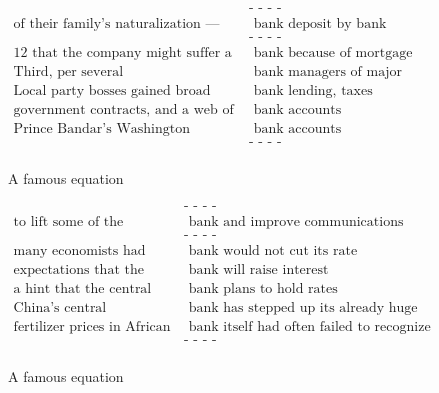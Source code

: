 \documentclass[a4paper,12pt,twoside,openright]{report}
\begin{document}
\begin{figure}[H]
\begin{align}
\text{                                                 } & \text{- - - -} \nonumber \\
\text{of their family’s naturalization —} & \text{ bank deposit by bank deposit} \nonumber \\
\text{                                                 } & \text{- - - -} \nonumber \\
\text{12 that the company might suffer a run on the} & \text{ bank because of mortgage concerns} \nonumber \\
\text{Third, per several} & \text{ bank managers of major national banks} \nonumber \\
\text{Local party bosses gained broad powers over state} & \text{ bank lending, taxes} \nonumber \\
\text{government contracts, and a web of} & \text{ bank accounts} \nonumber \\
\text{Prince Bandar’s Washington} & \text{ bank accounts} \nonumber \\
\text{                                                 } & \text{- - - -} \nonumber \\
\end{align}
\caption{A famous equation}
\end{figure}


\begin{figure}[H]
\begin{align}
\text{                                                    } & \text{- - - -} \nonumber \\
 \text{to lift some of the mystery surrounding the central} & \text{ bank and improve communications with Wall Street} \nonumber \\
\text{                                                    } & \text{- - - -} \nonumber \\
\text{many economists had predicted that the} & \text{ bank would not cut its rate} \nonumber \\
\text{expectations that the central} & \text{ bank will raise interest} \nonumber \\
\text{a hint that the central} & \text{ bank plans to hold rates} \nonumber \\
\text{China’s central} & \text{ bank has stepped up its already huge purchases of dollar-denominated securities} \nonumber \\
\text{fertilizer prices in African countries, but that the} & \text{ bank itself had often failed to recognize} \nonumber \\
\text{                                                    } & \text{- - - -} \nonumber \\
\end{align}
\caption{A famous equation}
\end{figure}
\end{document}
